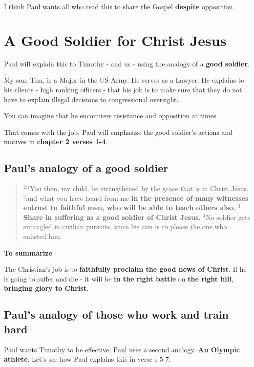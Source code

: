 \documentclass[12pt]{article} %
\newcommand{\superscript}[1]{\ensuremath{^{\textrm{#1}}}}
\begin{document}
I think Paul wants all who read this to share the Gospel \textbf{despite}
opposition. 

\section{A Good Soldier for Christ Jesus}

Paul will explain this to Timothy - and us - using the analogy of a
\textbf{good soldier}.

My son, Tim, is a Major in the US Army. He serves as a Lawyer. He explains to
his clients - high ranking officers - that his job is to make sure that they
do not have to explain illegal decisions to congressional oversight.

You can imagine that he encounters resistance and opposition at times.

That comes with the job. Paul will emphasize the good soldier's actions
and motives in \textbf{chapter 2 verses 1-4}.

\subsection{Paul's analogy of a good soldier}


\begin{quote}
\superscript{2:1}You then, my child, be strengthened by the grace that
is in Christ Jesus, \superscript{2}and what you have heard from me
\textbf{in the presence of many witnesses entrust to faithful men, who
will be able to teach others also. \superscript{3}Share in suffering
as a good soldier of Christ Jesus.} \superscript{4}No soldier gets
entangled in civilian pursuits, since his aim is to please the one who
enlisted him.
\end{quote}

\textbf{To summarize}

The Christian's job is to \textbf{faithfully proclaim the good news of Christ}.
If he is going to suffer and die - it will be \textbf{in the right battle}
on \textbf{the right hill}, \textbf{bringing glory to Christ}.

\subsection{Paul's analogy of those who work and train hard}

Paul wants Timothy to be effective. Paul uses a second analogy.
\textbf{An Olympic athlete}. Let's see how Paul explains this in
verse s {5-7}:
\end{document}
